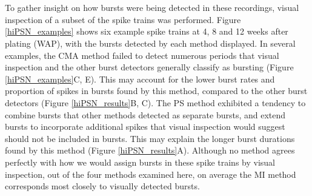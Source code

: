 \documentclass[12pt, titlepage]{article}
\begin{document}
	\\ \\ To gather insight on how bursts were being detected in these recordings, visual inspection of a subset of the spike trains was performed.  Figure \ref{hiPSN_examples} shows six example spike trains at 4, 8 and 12 weeks after plating (WAP), with the bursts detected by each method displayed. In several examples, the CMA method failed to detect numerous periods that visual inspection and the other burst detectors generally classify as bursting (Figure \ref{hiPSN_examples}C, E). This may account for the lower burst rates and proportion of spikes in bursts found by this method, compared to the other burst detectors (Figure \ref{hiPSN_results}B, C). The PS method exhibited a tendency to combine bursts that other methods detected as separate bursts, and extend bursts to incorporate additional spikes that visual inspection would suggest should not be included in bursts. This may explain the longer burst durations found by this method (Figure \ref{hiPSN_results}A). Although no method agrees perfectly with how we would assign bursts in these spike trains by visual inspection, out of the four methods examined here, on average the MI method corresponds most closely to visually detected bursts. 
\end{document}
